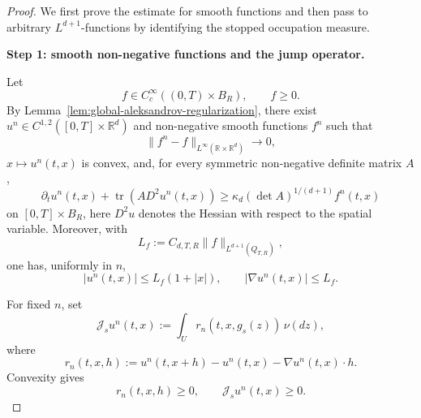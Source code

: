\documentclass[12pt,oneside, reqno]{amsart}
\numberwithin{equation}{section}
\begin{document}
\begin{proof}
	We first prove the estimate for smooth functions and then pass to
	arbitrary \(L^{d+1}\)-functions by identifying the stopped occupation
	measure.
	
	
	\textbf{Step 1: smooth non-negative functions and the jump operator.}
	
	Let
	\[
	f\in C_c^\infty((0,T)\times B_R),
	\qquad
	f\geq0.
	\]
	By Lemma~\ref{lem:global-aleksandrov-regularization}, there exist
	\(u^n\in C^{1,2}([0,T]\times\mathbb R^d)\) and non-negative smooth
	functions \(f^n\) such that
	\begin{equation}
		\label{eq:regularized-f-convergence}
		\|f^n-f\|_{L^\infty(\mathbb R\times\mathbb R^d)}
		\longrightarrow0,
	\end{equation}
	\(x\mapsto u^n(t,x)\) is convex, and, for every symmetric
	non-negative definite matrix \(A\),
	\begin{equation}
		\label{eq:regularized-aleksandrov-inequality}
		\partial_tu^n(t,x)
		+\operatorname{tr}\!\left(A D^2u^n(t,x)\right)
		\geq
		\kappa_d(\det A)^{1/(d+1)}f^n(t,x)
	\end{equation}
	on \([0,T]\times B_R\), here \(D^2u\) denotes the Hessian with respect to the spatial variable. Moreover, with
	\[
	L_f
	:=
	C_{d,T,R}\|f\|_{L^{d+1}(Q_{T,R})},
	\]
	one has, uniformly in \(n\),
	\begin{equation}
		\label{eq:regularized-growth-gradient-bounds}
		|u^n(t,x)|
		\leq
		L_f(1+|x|),
		\qquad
		|\nabla u^n(t,x)|
		\leq
		L_f.
	\end{equation}
	
	For fixed \(n\), set
	\begin{equation}
		\label{eq:jump-operator}
		\mathcal J_su^n(t,x)
		:=
		\int_U r_n(t,x,g_s(z))\,\nu(dz),
	\end{equation}
	where
	\[
	r_n(t,x,h)
	:=
	u^n(t,x+h)-u^n(t,x)-\nabla u^n(t,x)\cdot h.
	\]
	Convexity gives
	\begin{equation}
		\label{eq:jump-operator-positive}
		r_n(t,x,h)\geq0,
		\qquad
		\mathcal J_su^n(t,x)\geq0.
	\end{equation}
	

\end{proof}
\end{document}
